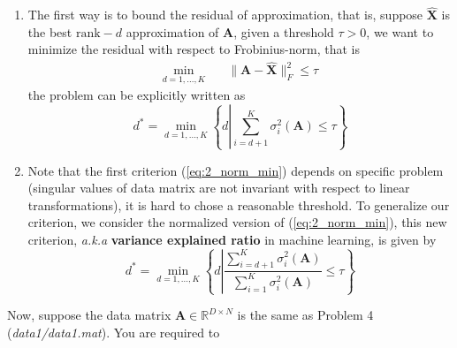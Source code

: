 \documentclass[english,onecolumn]{IEEEtran}
\begin{document}
\begin{enumerate}
    \item The first way is to bound the residual of approximation, that is, suppose $\hat{\mathbf{X}}$ is the best $\mathrm{rank}-d$ approximation of $\mathbf{A}$, given a threshold $\tau>0$, we want to minimize the residual with respect to Frobinius-norm, that is
    \begin{align}
        \min_{d=1,\dots,K}&\quad \|\mathbf{A}-\hat{\mathbf{X}}\|_F^2\leq \tau
    \end{align}
    the problem can be explicitly written as
    \begin{equation}\label{eq:2_norm_min}
        d^*=\min_{d=1,\dots,K}\left\{d\left|\sum_{i=d+1}^K\sigma_{i}^2(\mathbf{A})\leq \tau\right.\right\}
    \end{equation}
    
    \item Note that the first criterion (\ref{eq:2_norm_min}) depends on specific problem (singular values of data matrix are not invariant with respect to linear transformations), it is hard to chose a reasonable threshold. To generalize our criterion, we consider the normalized version of (\ref{eq:2_norm_min}), this new criterion, \textit{a.k.a} \textbf{variance explained ratio} in machine learning, is given by
    \begin{equation}\label{eq:accumulated_error}
        d^*=\min_{d=1,\dots,K}\left\{d\left|\frac{\sum_{i=d+1}^K\sigma_{i}^2(\mathbf{A})}{\sum_{i=1}^K\sigma_i^2(\mathbf{A})}\leq \tau\right.\right\}
    \end{equation}
\end{enumerate}
Now, suppose the data matrix $\mathbf{A}\in\mathbb{R}^{D\times N}$ is the same as {\color{blue} Problem 4} (\emph{data1/data1.mat}). You are required to 
\end{document}
